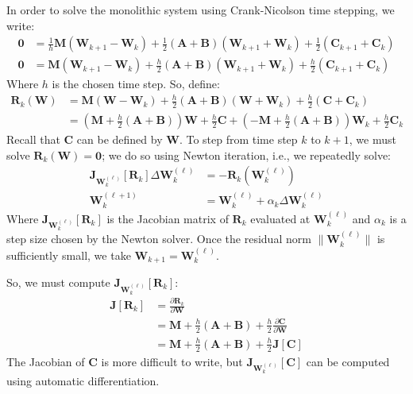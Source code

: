\documentclass{article}
\newcommand{\bvec}[1]{\boldsymbol{#1}}
\newcommand{\brvec}[1]{\mathbf{#1}}
\newcommand{\bmat}[1]{\boldsymbol{#1}}
\newcommand{\brmat}[1]{\mathbf{#1}}
\begin{document}
In order to solve the monolithic system using Crank-Nicolson
time stepping, we write:
\begin{align*}
    \brvec{0}
        & = \frac{1}{h} \bmat{M} (\bvec{W}_{k + 1} - \bvec{W}_k)
            + \frac{1}{2} (\bmat{A} + \bmat{B}) (\bvec{W}_{k + 1} + \bvec{W}_k)
            + \frac{1}{2} (\bvec{C}_{k + 1} + \bvec{C}_k) \\
    \brvec{0}
        & = \bmat{M} (\bvec{W}_{k + 1} - \bvec{W}_k)
            + \frac{h}{2} (\bmat{A} + \bmat{B}) (\bvec{W}_{k + 1} + \bvec{W}_k)
            + \frac{h}{2} (\bvec{C}_{k + 1} + \bvec{C}_k)
\end{align*}
\noindent Where $h$ is the chosen time step. So, define:
\begin{align*}
    \bvec{R}_k(\bvec{W})
        & = \bmat{M} (\bvec{W} - \bvec{W}_k)
            + \frac{h}{2} (\bmat{A} + \bmat{B}) (\bvec{W} + \bvec{W}_k)
            + \frac{h}{2} (\bvec{C} + \bvec{C}_k) \\
        & = (\bmat{M} + \frac{h}{2} (\bmat{A} + \bmat{B})) \bvec{W}
            + \frac{h}{2} \bvec{C}
            + (-\bmat{M} + \frac{h}{2} (\bmat{A} + \bmat{B})) \bvec{W}_k
            + \frac{h}{2} \bvec{C}_k
\end{align*}
\noindent Recall that $\bvec{C}$ can be defined by $\bvec{W}$.
To step from time step $k$ to $k + 1$,
we must solve $\bvec{R}_k(\bvec{W}) = \brvec{0}$;
we do so using Newton iteration, i.e., we repeatedly solve:
\begin{align*}
    \brmat{J}_{\bvec{W}_k^{(\ell)}}[\bvec{R}_k] \Delta \bvec{W}_k^{(\ell)}
        & = -\bvec{R}_k(\bvec{W}_k^{(\ell)}) \\
    \bvec{W}_k^{(\ell + 1)}
        & = \bvec{W}_k^{(\ell)} + \alpha_k \Delta \bvec{W}_k^{(\ell)}
\end{align*}
Where $\brmat{J}_{\bvec{W}_k^{(\ell)}}[\bvec{R}_k]$
is the Jacobian matrix of $\bvec{R}_k$
evaluated at $\bvec{W}_k^{(\ell)}$
and $\alpha_k$ is a step size chosen by the Newton solver.
Once the residual norm $\|\bvec{W}_k^{(\ell)}\|$ is sufficiently small,
we take $\bvec{W}_{k + 1} = \bvec{W}_k^{(\ell)}$.

So, we must compute $\brmat{J}_{\bvec{W}_k^{(\ell)}}[\bvec{R}_k]$:
\begin{align*}
    \brmat{J}[\bvec{R}_k]
        & = \frac{\partial \bvec{R}_k}{\partial \bvec{W}} \\
        & = \bmat{M} + \frac{h}{2} (\bmat{A} + \bmat{B})
            + \frac{h}{2} \frac{\partial \bvec{C}}{\partial \bvec{W}} \\
        & = \bmat{M} + \frac{h}{2} (\bmat{A} + \bmat{B})
            + \frac{h}{2} \brmat{J}[\bvec{C}]
\end{align*}
\noindent The Jacobian of $\bvec{C}$ is more difficult to write,
but $\brmat{J}_{\bvec{W}_k^{(\ell)}}[\bvec{C}]$ can be computed
using automatic differentiation.
\end{document}
